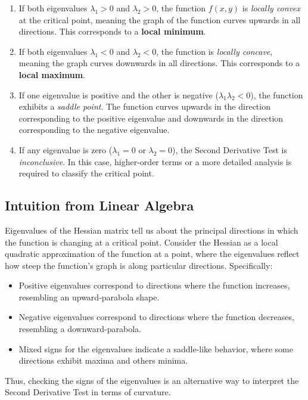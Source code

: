 \documentclass{report}
\begin{document}
\begin{enumerate}
	\item If both eigenvalues \( \lambda_1 > 0 \) and \( \lambda_2 > 0 \), the function \( f(x, y) \) is \emph{locally convex} at the critical point, meaning the graph of the function curves upwards in all directions. This corresponds to a \textbf{local minimum}.
	\item If both eigenvalues \( \lambda_1 < 0 \) and \( \lambda_2 < 0 \), the function is \emph{locally concave}, meaning the graph curves downwards in all directions. This corresponds to a \textbf{local maximum}.
	\item If one eigenvalue is positive and the other is negative (\( \lambda_1 \lambda_2 < 0 \)), the function exhibits a \emph{saddle point}. The function curves upwards in the direction corresponding to the positive eigenvalue and downwards in the direction corresponding to the negative eigenvalue.
	\item If any eigenvalue is zero (\( \lambda_1 = 0 \) or \( \lambda_2 = 0 \)), the Second Derivative Test is \emph{inconclusive}. In this case, higher-order terms or a more detailed analysis is required to classify the critical point.
\end{enumerate}

\subsection{Intuition from Linear Algebra}
Eigenvalues of the Hessian matrix tell us about the principal directions in which the function is changing at a critical point. Consider the Hessian as a local quadratic approximation of the function at a point, where the eigenvalues reflect how steep the function’s graph is along particular directions. Specifically:
\begin{itemize}
	\item Positive eigenvalues correspond to directions where the function increases, resembling an upward-parabola shape.
	\item Negative eigenvalues correspond to directions where the function decreases, resembling a downward-parabola.
	\item Mixed signs for the eigenvalues indicate a saddle-like behavior, where some directions exhibit maxima and others minima.
\end{itemize}

Thus, checking the signs of the eigenvalues is an alternative way to interpret the Second Derivative Test in terms of curvature.
\end{document}
